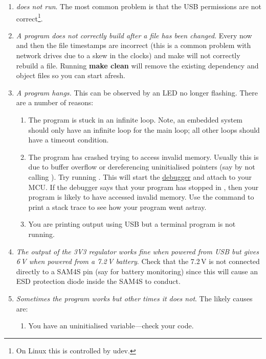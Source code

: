 \begin{enumerate}
\item
  \emph{ does not run}. The most common problem is
  that the USB permissions are not correct\footnote{On Linux this is
    controlled by udev.}.

\item
  \emph{A program does not correctly build after a file has been
    changed}. Every now and then the file timestamps are incorrect
  (this is a common problem with network drives due to a skew in the
  clocks) and make will not correctly rebuild a file. Running
  \textbf{make clean} will remove the existing dependency and object
  files so you can start afresh.

\item
  \emph{A program hangs.} This can be observed by an LED no longer
  flashing. There are a number of reasons:

  \begin{enumerate}
  \item
    The program is stuck in an infinite loop. Note, an embedded system
    should only have an infinite loop for the main loop; all other loops
    should have a timeout condition.
  \item
    The program has crashed trying to access invalid memory. Usually
    this is due to buffer overflow or dereferencing uninitialised
    pointers (say by not calling ). Try running
    .  This will start the
    \protect\hyperref[debugging]{debugger} and attach to your MCU. If
    the debugger says that your program has stopped in
    , then your program is likely to have
    accessed invalid memory. Use the  command to print a
    stack trace to see how your program went astray.

  \item You are printing output using USB but a terminal program is
    not running.
  \end{enumerate}

\item
  \emph{The output of the 3V3 regulator works fine when powered from
    USB but gives 6\,V when powered from a 7.2\,V battery}. Check that
  the 7.2\,V is not connected directly to a SAM4S pin (say for battery
  monitoring) since this will cause an ESD protection diode inside the
  SAM4S to conduct.

\item \emph{Sometimes the program works but other times it does not}.
  The likely causes are:
  \begin{enumerate}
  \item You have an uninitialised variable---check your code.


\end{enumerate}
\end{enumerate}
